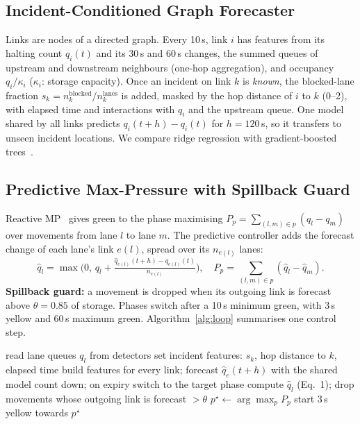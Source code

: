 \documentclass[conference]{IEEEtran}
\begin{document}
\subsection{Incident-Conditioned Graph Forecaster}
Links are nodes of a directed graph. Every 10\,s, link $i$ has features from its halting count $q_i(t)$ and its 30\,s and 60\,s changes, the summed queues of upstream and downstream neighbours (one-hop aggregation), and occupancy $q_i/\kappa_i$ ($\kappa_i$: storage capacity). Once an incident on link $k$ is \emph{known}, the blocked-lane fraction $s_k=n_k^{\text{blocked}}/n_k^{\text{lanes}}$ is added, masked by the hop distance of $i$ to $k$ (0--2), with elapsed time and interactions with $q_i$ and the upstream queue. One model shared by all links predicts $q_i(t+h)-q_i(t)$ for $h=120$\,s, so it transfers to unseen incident locations. We compare ridge regression with gradient-boosted trees~\cite{friedman2001gbm}.

\subsection{Predictive Max-Pressure with Spillback Guard}
Reactive MP~\cite{varaiya2013maxpressure} gives green to the phase maximising $P_p=\sum_{(l,m)\in p}(q_l-q_m)$ over movements from lane $l$ to lane $m$. The predictive controller adds the forecast change of each lane's link $e(l)$, spread over its $n_{e(l)}$ lanes:
\begin{equation}
\hat q_l=\max\!\Big(0,\,q_l+\tfrac{\hat q_{e(l)}(t{+}h)-q_{e(l)}(t)}{n_{e(l)}}\Big),\quad P_p=\!\!\sum_{(l,m)\in p}\!\!(\hat q_l-\hat q_m).
\end{equation}
\textbf{Spillback guard:} a movement is dropped when its outgoing link is forecast above $\theta=0.85$ of storage. Phases switch after a 10\,s minimum green, with 3\,s yellow and 60\,s maximum green. Algorithm~\ref{alg:loop} summarises one control step.

\begin{algorithm}[!htbp]
\caption{One step of the closed loop (every 1\,s)}
\label{alg:loop}
\begin{algorithmic}[1]
\State read lane queues $q_l$ from detectors
  \State set incident features: $s_k$, hop distance to $k$, elapsed time
\EndIf
{}
  \State build features for every link; forecast $\hat q_e(t{+}h)$ with the shared model
\EndIf
{}
   \State count down; on expiry switch to the target phase
    \State compute $\hat q_l$ (Eq.~1); drop movements whose outgoing link is forecast $>\theta$
    \State $p^\star \gets \arg\max_p P_p$
     \State start 3\,s yellow towards $p^\star$ \EndIf
  \EndIf
\EndFor
\end{algorithmic}
\end{algorithm}
\end{document}
